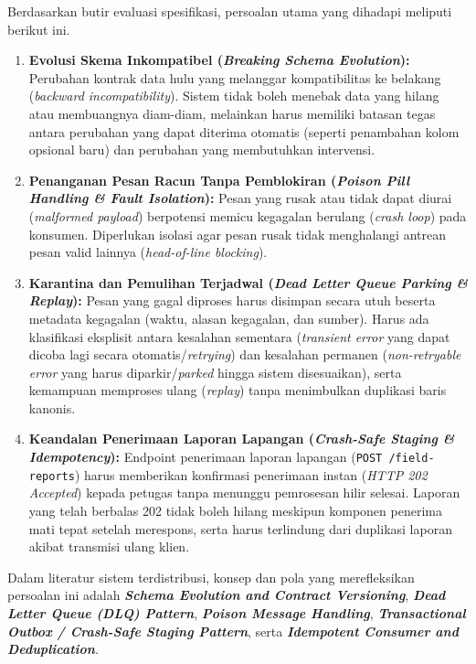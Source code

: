\noindent Berdasarkan butir evaluasi spesifikasi, persoalan utama yang dihadapi meliputi berikut ini.
\begin{enumerate}
    \item \textbf{Evolusi Skema Inkompatibel (\textit{Breaking Schema Evolution}):} Perubahan kontrak data hulu yang melanggar kompatibilitas ke belakang (\textit{backward incompatibility}). Sistem tidak boleh menebak data yang hilang atau membuangnya diam-diam, melainkan harus memiliki batasan tegas antara perubahan yang dapat diterima otomatis (seperti penambahan kolom opsional baru) dan perubahan yang membutuhkan intervensi.
    \item \textbf{Penanganan Pesan Racun Tanpa Pemblokiran (\textit{Poison Pill Handling \& Fault Isolation}):} Pesan yang rusak atau tidak dapat diurai (\textit{malformed payload}) berpotensi memicu kegagalan berulang (\textit{crash loop}) pada konsumen. Diperlukan isolasi agar pesan rusak tidak menghalangi antrean pesan valid lainnya (\textit{head-of-line blocking}).
    \item \textbf{Karantina dan Pemulihan Terjadwal (\textit{Dead Letter Queue Parking \& Replay}):} Pesan yang gagal diproses harus disimpan secara utuh beserta metadata kegagalan (waktu, alasan kegagalan, dan sumber). Harus ada klasifikasi eksplisit antara kesalahan sementara (\textit{transient error} yang dapat dicoba lagi secara otomatis/\textit{retrying}) dan kesalahan permanen (\textit{non-retryable error} yang harus diparkir/\textit{parked} hingga sistem disesuaikan), serta kemampuan memproses ulang (\textit{replay}) tanpa menimbulkan duplikasi baris kanonis.
    \item \textbf{Keandalan Penerimaan Laporan Lapangan (\textit{Crash-Safe Staging \& Idempotency}):} Endpoint penerimaan laporan lapangan (\texttt{POST /field-reports}) harus memberikan konfirmasi penerimaan instan (\textit{HTTP 202 Accepted}) kepada petugas tanpa menunggu pemrosesan hilir selesai. Laporan yang telah berbalas 202 tidak boleh hilang meskipun komponen penerima mati tepat setelah merespons, serta harus terlindung dari duplikasi laporan akibat transmisi ulang klien.
\end{enumerate}

\vspace{1em}

\noindent Dalam literatur sistem terdistribusi, konsep dan pola yang merefleksikan persoalan ini adalah \textbf{\textit{Schema Evolution and Contract Versioning}}, \textbf{\textit{Dead Letter Queue (DLQ) Pattern}}, \textbf{\textit{Poison Message Handling}}, \textbf{\textit{Transactional Outbox / Crash-Safe Staging Pattern}}, serta \textbf{\textit{Idempotent Consumer and Deduplication}}.

